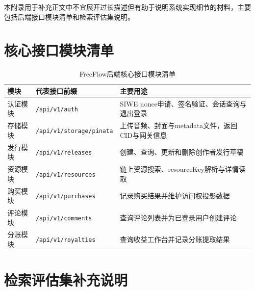 
\renewcommand{\thechapter}{附录}

本附录用于补充正文中不宜展开过长描述但有助于说明系统实现细节的材料，主要包括后端接口模块清单和检索评估集说明。

\section{核心接口模块清单}

\begin{table}[htbp]
    \linespread{1.45}
    \songti
    \centering
    \caption{FreeFlow后端核心接口模块清单}\label{tab:appendix_api_modules}
    \begin{tabular}{|l|p{4.4cm}|p{6.1cm}|}
        \hline
        模块   & 代表接口前缀                          & 主要用途                          \\ \hline
        认证模块 & \texttt{/api/v1/auth}           & SIWE nonce申请、签名验证、会话查询与退出登录   \\ \hline
        存储模块 & \texttt{/api/v1/storage/pinata} & 上传音频、封面与metadata文件，返回CID与网关信息 \\ \hline
        发行模块 & \texttt{/api/v1/releases}       & 创建、查询、更新和删除创作者发行草稿            \\ \hline
        资源模块 & \texttt{/api/v1/resources}      & 链上资源搜索、resourceKey解析与详情读取     \\ \hline
        购买模块 & \texttt{/api/v1/purchases}      & 记录购买结果并维护访问权投影数据              \\ \hline
        评论模块 & \texttt{/api/v1/comments}       & 查询评论列表并为已登录用户创建评论             \\ \hline
        分账模块 & \texttt{/api/v1/royalties}      & 查询收益工作台并记录分账提取结果              \\ \hline
    \end{tabular}
\end{table}


\section{检索评估集补充说明}

